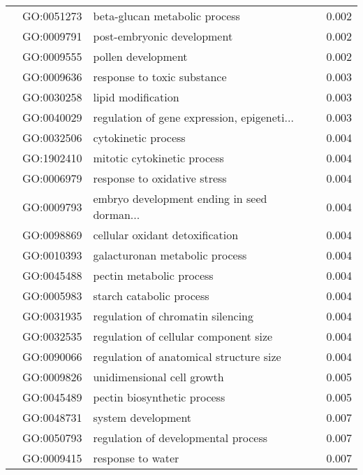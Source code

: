 \begin{longtable}{lllr}
   & GO:0051273 &                beta-glucan metabolic process &         0.002 \\
   & GO:0009791 &                   post-embryonic development &         0.002 \\
   & GO:0009555 &                           pollen development &         0.002 \\
   & GO:0009636 &                  response to toxic substance &         0.003 \\
   & GO:0030258 &                           lipid modification &         0.003 \\
   & GO:0040029 &  regulation of gene expression, epigeneti... &         0.003 \\
   & GO:0032506 &                          cytokinetic process &         0.004 \\
   & GO:1902410 &                  mitotic cytokinetic process &         0.004 \\
   & GO:0006979 &                 response to oxidative stress &         0.004 \\
   & GO:0009793 &  embryo development ending in seed dorman... &         0.004 \\
   & GO:0098869 &              cellular oxidant detoxification &         0.004 \\
   & GO:0010393 &               galacturonan metabolic process &         0.004 \\
   & GO:0045488 &                     pectin metabolic process &         0.004 \\
   & GO:0005983 &                     starch catabolic process &         0.004 \\
   & GO:0031935 &            regulation of chromatin silencing &         0.004 \\
   & GO:0032535 &        regulation of cellular component size &         0.004 \\
   & GO:0090066 &      regulation of anatomical structure size &         0.004 \\
   & GO:0009826 &                   unidimensional cell growth &         0.005 \\
   & GO:0045489 &                  pectin biosynthetic process &         0.005 \\
   & GO:0048731 &                           system development &         0.007 \\
   & GO:0050793 &          regulation of developmental process &         0.007 \\
   & GO:0009415 &                            response to water &         0.007 \\

\end{longtable}
